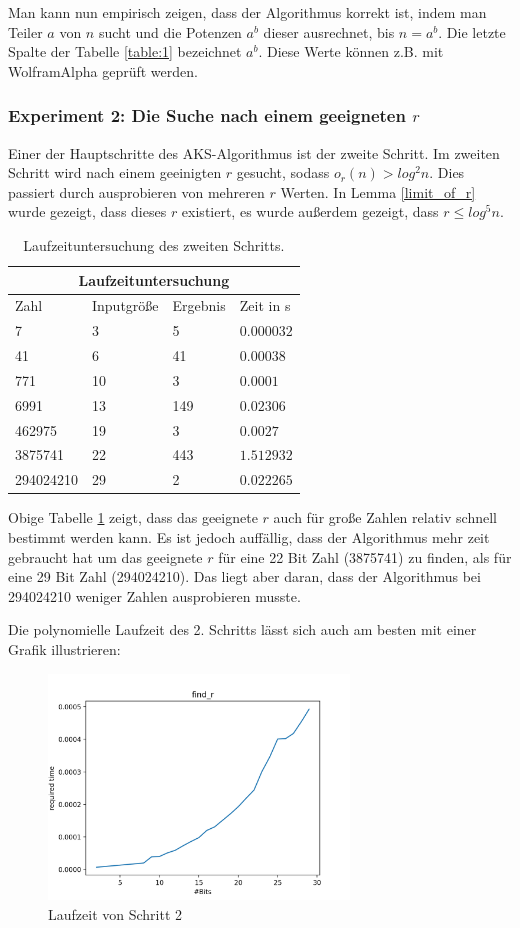 \documentclass[12pt,oneside]{article}
\theoremstyle{remark}
\theoremstyle{definition}
\begin{document}
Man kann nun empirisch zeigen, dass der Algorithmus korrekt ist, indem man Teiler $a $ von $n$ sucht und die Potenzen $a^b$ dieser ausrechnet, bis $n = a^b$. Die letzte Spalte der Tabelle \ref{table:1} bezeichnet $a^b$. Diese Werte können z.B. mit WolframAlpha geprüft werden. 


\newpage

\subsubsection{Experiment 2: Die Suche nach einem geeigneten $r$}
Einer der Hauptschritte des AKS-Algorithmus ist der zweite Schritt. Im zweiten Schritt wird nach einem geeinigten $r$ gesucht, sodass $o_r(n) > log^2 n$. Dies passiert durch ausprobieren von mehreren $r$ Werten. In Lemma \ref{limit_of_r} wurde gezeigt, dass dieses $r$ existiert, es wurde außerdem gezeigt, dass $r \leq log^5 n$.  
\begin{table}[h!]
\centering
\begin{tabular}{ |p{3cm}||p{3cm}|p{3cm}|p{3cm}|  }
 \hline
 \multicolumn{4}{|c|}{Laufzeituntersuchung} \\
 \hline
 Zahl & Inputgröße &Ergebnis&Zeit in s\\
 \hline
 7   & 3    &5&   $0.000032$\\
 41&   6  & 41   &$0.00038$\\
 771 &10 & 3&  $0.0001$\\
 6991    &13 & 149&  $0.02306$\\
 462975&   19  & 3&$ 0.0027$\\
 3875741& 22  & 443   &$1.512932$\\
 294024210& 29  & 2&$0.022265$\\
 \hline
\end{tabular}
 \caption{Laufzeituntersuchung des zweiten Schritts.}
\label{table:2}
\end{table}

Obige Tabelle \ref{table:2} zeigt, dass das geeignete $r$ auch für große Zahlen relativ schnell bestimmt werden kann. Es ist jedoch auffällig, dass der Algorithmus mehr zeit gebraucht hat um das geeignete $r$ für eine 22 Bit Zahl (3875741) zu finden, als für eine 29 Bit Zahl (294024210). Das liegt aber daran, dass der Algorithmus bei 294024210 weniger Zahlen ausprobieren musste.

Die polynomielle Laufzeit des 2. Schritts lässt sich auch am besten mit einer Grafik illustrieren:
\begin{figure}[h]
\includegraphics[width=8cm]{plots/findR.png}
\centering
\caption{Laufzeit von Schritt 2}
\end{figure}
\end{document}
